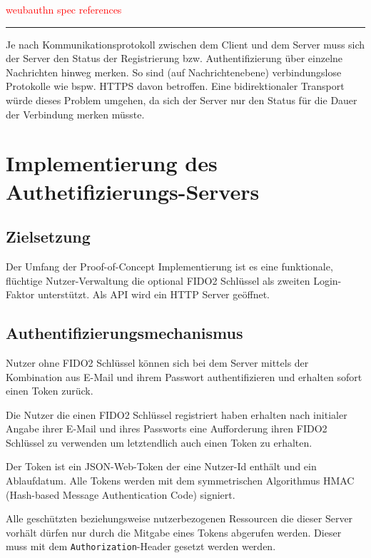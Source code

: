 \documentclass[journal]{IEEEtran}
\begin{document}
\textcolor{red}{weubauthn spec references}

\vspace{0.25em}
\rule{0.45\textwidth}{0.4pt}
\vspace{0.5em}

Je nach Kommunikationsprotokoll zwischen dem Client und dem Server muss sich
der Server den Status der Registrierung bzw. Authentifizierung über einzelne
Nachrichten hinweg merken. So sind (auf Nachrichtenebene) verbindungslose
Protokolle wie bspw. HTTPS davon betroffen. Eine bidirektionaler Transport
würde dieses Problem umgehen, da sich der Server nur den Status für die Dauer
der Verbindung merken müsste.

\section{Implementierung des Authetifizierungs-Servers}

\subsection{Zielsetzung}

Der Umfang der Proof-of-Concept Implementierung ist es eine funktionale,
flüchtige Nutzer-Verwaltung die optional FIDO2 Schlüssel als zweiten
Login-Faktor unterstützt. Als API wird ein HTTP Server geöffnet.

\subsection{Authentifizierungsmechanismus}

Nutzer ohne FIDO2 Schlüssel können sich bei dem Server mittels der Kombination
aus E-Mail und ihrem Passwort authentifizieren und erhalten sofort einen Token
zurück.

Die Nutzer die einen FIDO2 Schlüssel registriert haben erhalten nach
initialer Angabe ihrer E-Mail und ihres Passworts eine Aufforderung ihren FIDO2
Schlüssel zu verwenden um letztendlich auch einen Token zu erhalten.

Der Token ist ein JSON-Web-Token der eine Nutzer-Id enthält und ein
Ablaufdatum. Alle Tokens werden mit dem symmetrischen Algorithmus HMAC
(Hash-based Message Authentication Code) signiert.

Alle geschützten beziehungsweise nutzerbezogenen Ressourcen die dieser Server
vorhält dürfen nur durch die Mitgabe eines Tokens abgerufen werden. Dieser muss
mit dem \texttt{Authorization}-Header gesetzt werden werden.
\end{document}
